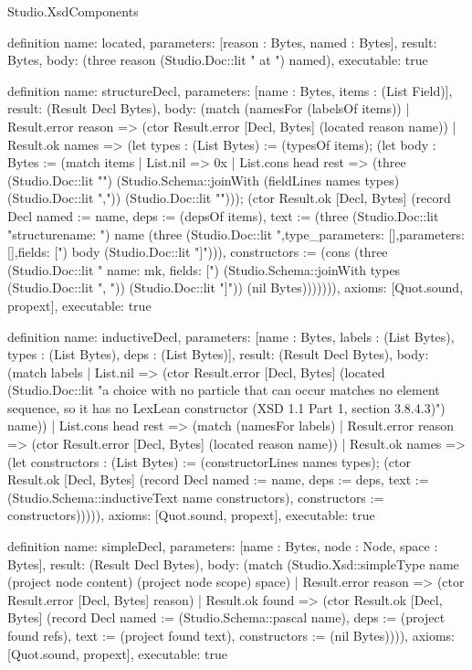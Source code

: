 \begin{lexlean}{Studio.XsdComponents}
\begin{semanticmodule}
definition{
  name: located,
  parameters: [reason : Bytes, named : Bytes],
  result: Bytes,
  body: (three reason (Studio.Doc::lit " at ") named),
  executable: true
}

definition{
  name: structureDecl,
  parameters: [name : Bytes, items : (List Field)],
  result: (Result Decl Bytes),
  body: (match (namesFor (labelsOf items))
    | Result.error reason => (ctor Result.error [Decl, Bytes] (located reason name))
    | Result.ok names => (let types : (List Bytes) := (typesOf items); (let body : Bytes := (match items
      | List.nil => 0x
      | List.cons head rest => (three (Studio.Doc::lit "\n") (Studio.Schema::joinWith (fieldLines names types) (Studio.Doc::lit ",\n")) (Studio.Doc::lit "\n  "))); (ctor Result.ok [Decl, Bytes] (record Decl {named := name, deps := (depsOf items), text := (three (Studio.Doc::lit "structure{\n  name: ") name (three (Studio.Doc::lit ",\n  type_parameters: [],\n  parameters: [],\n  fields: [") body (Studio.Doc::lit "]\n}\n"))), constructors := (cons (three (Studio.Doc::lit "    {name: mk, fields: [") (Studio.Schema::joinWith types (Studio.Doc::lit ", ")) (Studio.Doc::lit "]}")) (nil Bytes))}))))),
  axioms: [Quot.sound, propext],
  executable: true
}

definition{
  name: inductiveDecl,
  parameters: [name : Bytes, labels : (List Bytes), types : (List Bytes), deps : (List Bytes)],
  result: (Result Decl Bytes),
  body: (match labels
    | List.nil => (ctor Result.error [Decl, Bytes] (located (Studio.Doc::lit "a choice with no particle that can occur matches no element sequence, so it has no LexLean constructor (XSD 1.1 Part 1, section 3.8.4.3)") name))
    | List.cons head rest => (match (namesFor labels)
      | Result.error reason => (ctor Result.error [Decl, Bytes] (located reason name))
      | Result.ok names => (let constructors : (List Bytes) := (constructorLines names types); (ctor Result.ok [Decl, Bytes] (record Decl {named := name, deps := deps, text := (Studio.Schema::inductiveText name constructors), constructors := constructors}))))),
  axioms: [Quot.sound, propext],
  executable: true
}

definition{
  name: simpleDecl,
  parameters: [name : Bytes, node : Node, space : Bytes],
  result: (Result Decl Bytes),
  body: (match (Studio.Xsd::simpleType name (project node content) (project node scope) space)
    | Result.error reason => (ctor Result.error [Decl, Bytes] reason)
    | Result.ok found => (ctor Result.ok [Decl, Bytes] (record Decl {named := (Studio.Schema::pascal name), deps := (project found refs), text := (project found text), constructors := (nil Bytes)}))),
  axioms: [Quot.sound, propext],
  executable: true
}


\end{semanticmodule}
\end{lexlean}
